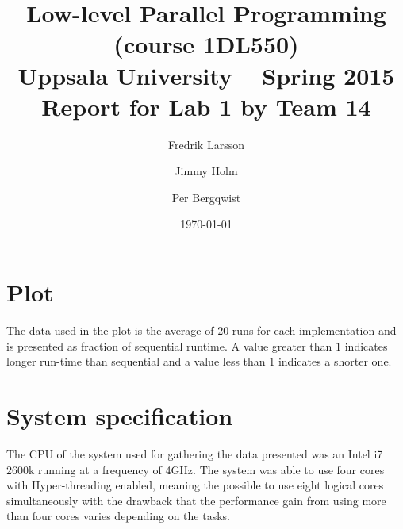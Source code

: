 \documentclass[a4paper,11pt]{article}
\title{\textbf{Low-level Parallel Programming (course 1DL550) \\
    Uppsala University -- Spring 2015 \\
    Report for Lab 1 by Team 14}}
\author{Fredrik Larsson \and Jimmy Holm \and Per Bergqwist}
\date{\today}
\begin{document}
\maketitle

\section{Plot}
\begin{center}
\end{center}
The data used in the plot is the average of 20 runs for each
implementation and is presented as fraction of sequential runtime. A value greater than $1$ indicates 
longer run-time than sequential and a value less than $1$ indicates a shorter one.
\section{System specification}
The CPU of the system used for gathering the data presented was an Intel i7 2600k
running at a frequency of 4GHz. The system was able to use four cores
with Hyper-threading enabled, meaning the possible to use eight logical
cores simultaneously with the drawback that the performance gain from
using more than four cores varies depending on the tasks.
\end{document}
